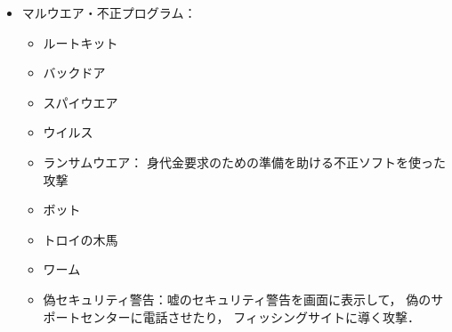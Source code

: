 \begin{itemize}
\begin{itemize}
            \item
              レインボーテーブル攻撃(\ref{dataManagement})
            \item
             スニッフィング：盗聴でパスワードを盗む攻撃
         \end{itemize}
      \item 
         マルウエア・不正プログラム：
         \begin{itemize}   
            \item   
               ルートキット
            \item   
                バックドア
            \item   
               スパイウエア
            \item   
                ウイルス
            \item 
               ランサムウエア：
               身代金要求のための準備を助ける不正ソフトを使った攻撃
            \item 
               ボット
            \item
               トロイの木馬
            \item
              ワーム
            \item 
              偽セキュリティ警告：嘘のセキュリティ警告を画面に表示して，
              偽のサポートセンターに電話させたり，
              フィッシングサイトに導く攻撃．
         \end{itemize}


\end{itemize}
